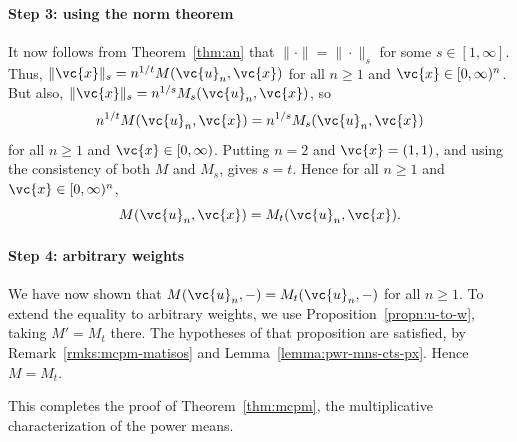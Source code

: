 \paragraph*{Step 3: using the norm theorem}
It now follows from Theorem~\ref{thm:an} that $\|\cdot\| = \|\cdot\|_s$ for
some $s \in [1, \infty]$.  Thus, $\|\vc{x}\|_s = n^{1/t} M(\vc{u}_n,
\vc{x})$ for all $n \geq 1$ and $\vc{x} \in [0, \infty)^n$.  But also,
  $\|\vc{x}\|_s = n^{1/s} M_s(\vc{u}_n, \vc{x})$, so
\[
n^{1/t} M(\vc{u}_n, \vc{x})
=
n^{1/s} M_s(\vc{u}_n, \vc{x})
\]
for all $n \geq 1$ and $\vc{x} \in [0, \infty)$.  Putting $n = 2$ and
  $\vc{x} = (1, 1)$, and using the consistency of both $M$ and $M_s$, gives
  $s = t$.  Hence for all $n \geq 1$ and $\vc{x} \in [0, \infty)^n$,
\[
M(\vc{u}_n, \vc{x})
=
M_t(\vc{u}_n, \vc{x}).
\]

\paragraph*{Step 4: arbitrary weights}
We have now shown that $M(\vc{u}_n, -) = M_t(\vc{u}_n, -)$ for all $n \geq
1$.  To extend the equality to arbitrary weights, we use
Proposition~\ref{propn:u-to-w}, taking $M' = M_t$ there.  The hypotheses of
that proposition are satisfied, by
Remark~\ref{rmks:mcpm-matisos} and
Lemma~\ref{lemma:pwr-mns-cts-px}.  Hence $M =
M_t$.

This completes the proof of Theorem~\ref{thm:mcpm}, the multiplicative
characterization of the power means.







